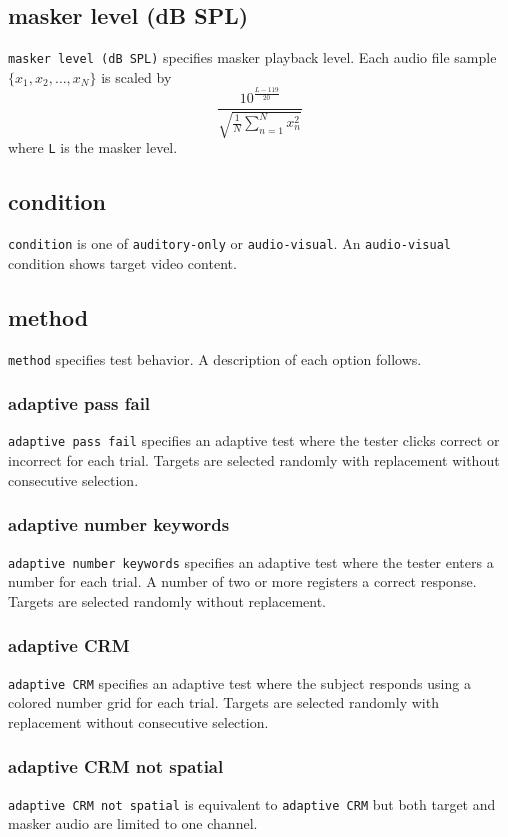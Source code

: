 \documentclass[11pt,pdftex,letterpaper]{article}
\begin{document}
\subsection{masker level (dB SPL)}
\texttt{masker level (dB SPL)} specifies masker playback level. Each audio file sample ${\displaystyle \{x_{1}, x_{2}, \dots , x_{N}\}}$ is scaled by
\begin{equation}
 \frac{10^{\frac{L-119}{20}}}{\sqrt{\frac{1}{N}\sum_{n=1}^{N}x_{n}^{2}}}\label{eq:masker-scale}
\end{equation}
where \texttt{L} is the masker level.
\subsection{condition}
\texttt{condition} is one of \texttt{auditory-only} or \texttt{audio-visual}. An \texttt{audio-visual} condition shows target video content.
\subsection{method}
\texttt{method} specifies test behavior. A description of each option follows.
\subsubsection{adaptive pass fail}
\texttt{adaptive pass fail} specifies an adaptive test where the tester clicks correct or incorrect for each trial. Targets are selected randomly with replacement without consecutive selection.
\subsubsection{adaptive number keywords}
\texttt{adaptive number keywords} specifies an adaptive test where the tester enters a number for each trial. A number of two or more registers a correct response. Targets are selected randomly without replacement.
\subsubsection{adaptive CRM}
\texttt{adaptive CRM} specifies an adaptive test where the subject responds using a colored number grid for each trial. Targets are selected randomly with replacement without consecutive selection.
\subsubsection{adaptive CRM not spatial}
\texttt{adaptive CRM not spatial} is equivalent to \texttt{adaptive CRM} but both target and masker audio are limited to one channel.
\end{document}
